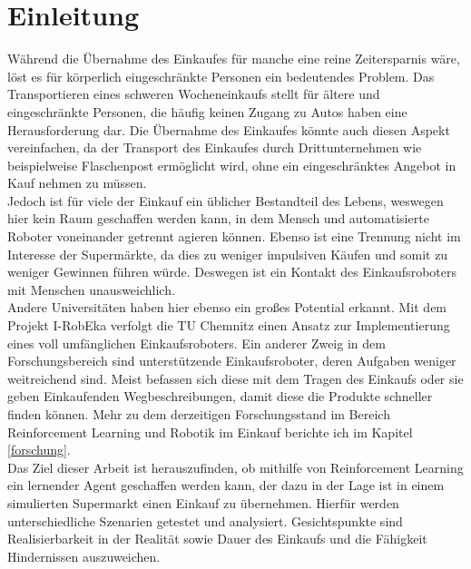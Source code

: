 \newpage
\section{Einleitung}
\label{einleitung}
Während die Übernahme des Einkaufes für manche eine reine Zeitersparnis wäre, löst es für körperlich eingeschränkte Personen ein bedeutendes Problem. Das Transportieren eines schweren Wocheneinkaufs stellt für ältere und eingeschränkte Personen, die häufig keinen Zugang zu Autos haben eine Herausforderung dar. Die Übernahme des Einkaufes könnte auch diesen Aspekt vereinfachen, da der Transport des Einkaufes durch Drittunternehmen wie beispielweise Flaschenpost ermöglicht wird, ohne ein eingeschränktes Angebot in Kauf nehmen zu müssen.
\\
Jedoch ist für viele der Einkauf ein üblicher Bestandteil des Lebens, weswegen hier kein Raum geschaffen werden kann, in dem Mensch und automatisierte Roboter voneinander getrennt agieren können. Ebenso ist eine Trennung nicht im Interesse der Supermärkte, da dies zu weniger impulsiven Käufen und somit zu weniger Gewinnen führen würde. Deswegen ist ein Kontakt des Einkaufsroboters mit Menschen unausweichlich. 
\\
Andere Universitäten haben hier ebenso ein großes Potential erkannt. Mit dem Projekt I-RobEka verfolgt die TU Chemnitz einen Ansatz zur Implementierung eines voll umfänglichen Einkaufsroboters. Ein anderer Zweig in dem Forschungsbereich sind unterstützende Einkaufsroboter, deren Aufgaben weniger weitreichend sind. Meist befassen sich diese mit dem Tragen des Einkaufs oder sie geben Einkaufenden Wegbeschreibungen, damit diese die Produkte schneller finden können. Mehr zu dem derzeitigen Forschungsstand im Bereich Reinforcement Learning und Robotik im Einkauf berichte ich im Kapitel \ref{forschung}. 
\\
Das Ziel dieser Arbeit ist herauszufinden, ob mithilfe von Reinforcement Learning ein lernender Agent geschaffen werden kann, der dazu in der Lage ist in einem simulierten Supermarkt einen Einkauf zu übernehmen. Hierfür werden unterschiedliche Szenarien getestet und analysiert. Gesichtspunkte sind Realisierbarkeit in der Realität sowie Dauer des Einkaufs und die Fähigkeit Hindernissen auszuweichen. 
\\

